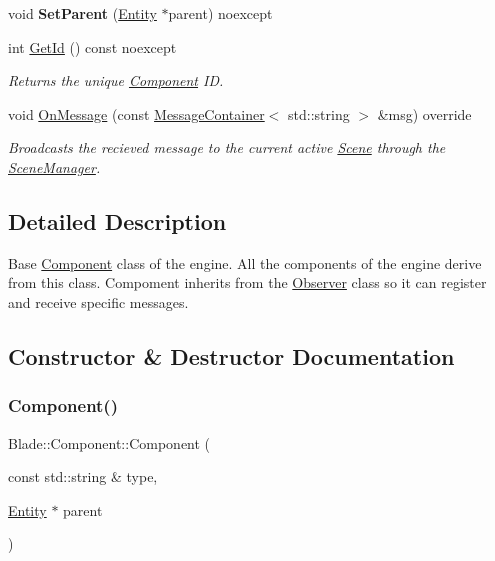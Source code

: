 \begin{DoxyCompactItemize}
\mbox{\label{class_blade_1_1_component_aa2c3b3da057763028c83ae550b2ed20f}} 
void {\bfseries Set\+Parent} (\hyperlink{class_blade_1_1_entity}{Entity} $\ast$parent) noexcept
\item 
int \hyperlink{class_blade_1_1_component_ab92acfebdc935b55b9275f0442d9c047}{Get\+Id} () const noexcept
\begin{DoxyCompactList}\small\item\em Returns the unique \hyperlink{class_blade_1_1_component}{Component} ID. \end{DoxyCompactList}\item 
void \hyperlink{class_blade_1_1_component_a4b33e2a714ea0ccdf754c29969fa8f67}{On\+Message} (const \hyperlink{class_blade_1_1_ref_counted_container}{Message\+Container}$<$ std\+::string $>$ \&msg) override
\begin{DoxyCompactList}\small\item\em Broadcasts the recieved message to the current active \hyperlink{class_blade_1_1_scene}{Scene} through the \hyperlink{class_blade_1_1_scene_manager}{Scene\+Manager}. \end{DoxyCompactList}\end{DoxyCompactItemize}


\subsection{Detailed Description}
Base \hyperlink{class_blade_1_1_component}{Component} class of the engine. All the components of the engine derive from this class. Compoment inherits from the \hyperlink{class_blade_1_1_observer}{Observer} class so it can register and receive specific messages. 

\subsection{Constructor \& Destructor Documentation}
\mbox{\label{class_blade_1_1_component_a9afd6318db086a2fa6bfdbbbc009ef85}} 
\subsubsection{\texorpdfstring{Component()}{Component()}}
{\footnotesize\ttfamily Blade\+::\+Component\+::\+Component (\begin{DoxyParamCaption}\item[{const std\+::string \&}]{type,  }\item[{\hyperlink{class_blade_1_1_entity}{Entity} $\ast$}]{parent }\end{DoxyParamCaption})}



